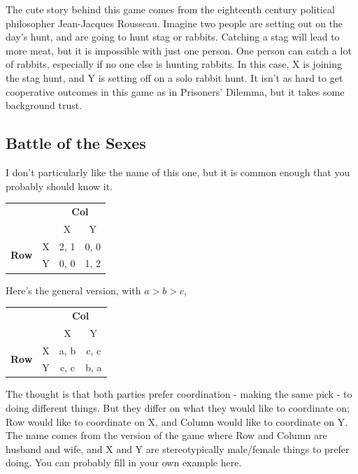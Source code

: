 \documentclass[openany]{book}
\begin{document}
The cute story behind this game comes from the eighteenth century political philosopher Jean-Jacques Rousseau. Imagine two people are setting out on the day's hunt, and are going to hunt stag or rabbits. Catching a stag will lead to more meat, but it is impossible with just one person. One person can catch a lot of rabbits, especially if no one else is hunting rabbits. In this case, X is joining the stag hunt, and Y is setting off on a solo rabbit hunt. It isn't as hard to get cooperative outcomes in this game as in Prisoners' Dilemma, but it takes some background trust.

\subsection{Battle of the Sexes}
I don't particularly like the name of this one, but it is common enough that you probably should know it.
\begin{center}
\begin{tabular}{l r | c c}
 & & \multicolumn{2}{c}{\textbf{Col}} \\
& & X & Y \\ \hline
\multirow{2}{*}{\textbf{Row}} & X & 2, 1 & 0, 0 \\ & Y & 0, 0 & 1, 2 \\
\end{tabular}
\end{center}
Here's the general version, with $a > b > c$,

\begin{center}
\begin{tabular}{l r | c c}
 & & \multicolumn{2}{c}{\textbf{Col}} \\
& & X & Y \\ \hline
\multirow{2}{*}{\textbf{Row}} & X & a, b & c, c \\ & Y & c, c & b, a \\
\end{tabular}
\end{center}
The thought is that both parties prefer coordination - making the same pick - to doing different things. But they differ on what they would like to coordinate on; Row would like to coordinate on X, and Column would like to coordinate on Y. The name comes from the version of the game where Row and Column are husband and wife, and X and Y are stereotypically male/female things to prefer doing. You can probably fill in your own example here.
\end{document}
